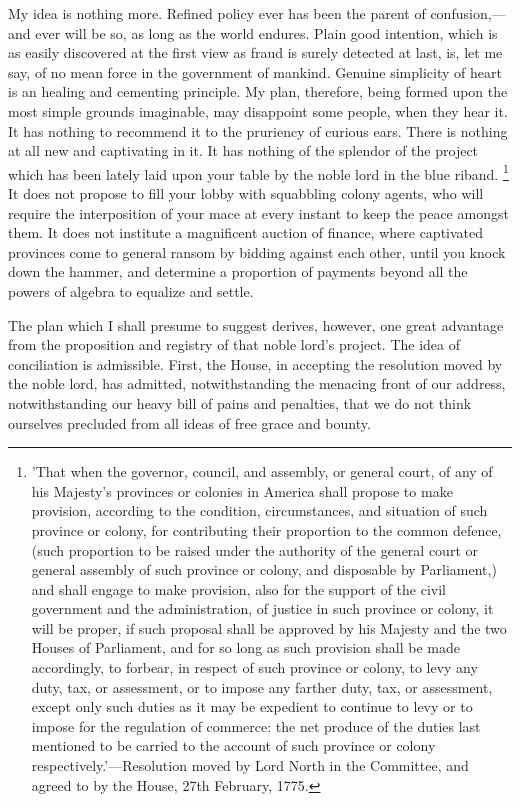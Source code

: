 My idea is nothing more. Refined policy ever has been the parent of confusion,—and ever will be so, as long as the world endures. Plain good intention, which is as easily discovered at the first view as fraud is surely detected at last, is, let me say, of no mean force in the government of mankind. Genuine simplicity of heart is an healing and cementing principle. My plan, therefore, being formed upon the most simple grounds imaginable, may disappoint some people, when they hear it. It has nothing to recommend it to the pruriency of curious ears. There is nothing at all new and captivating in it. It has nothing of the splendor of the project which has been lately laid upon your table by the noble lord in the blue riband.
\footnote{'That when the governor, council, and assembly, or general court, of any of his Majesty's provinces or colonies in America shall propose to make provision, according to the condition, circumstances, and situation of such province or colony, for contributing their proportion to the common defence, (such proportion to be raised under the authority of the general court or general assembly of such province or colony, and disposable by Parliament,) and shall engage to make provision, also for the support of the civil government and the administration, of justice in such province or colony, it will be proper, if such proposal shall be approved by his Majesty and the two Houses of Parliament, and for so long as such provision shall be made accordingly, to forbear, in respect of such province or colony, to levy any duty, tax, or assessment, or to impose any farther duty, tax, or assessment, except only such duties as it may be expedient to continue to levy or to impose for the regulation of commerce: the net produce of the duties last mentioned to be carried to the account of such province or colony respectively.'—Resolution moved by Lord North in the Committee, and agreed to by the House, 27th February, 1775.}
It does not propose to fill your lobby with squabbling colony agents, who will require the interposition of your mace at every instant to keep the peace amongst them. It does not institute a magnificent auction of finance, where captivated provinces come to general ransom by bidding against each other, until you knock down the hammer, and determine a proportion of payments beyond all the powers of algebra to equalize and settle.

The plan which I shall presume to suggest derives, however, one great advantage from the proposition and registry of that noble lord's project. The idea of conciliation is admissible. First, the House, in accepting the resolution moved by the noble lord, has admitted, notwithstanding the menacing front of our address, notwithstanding our heavy bill of pains and penalties, that we do not think ourselves precluded from all ideas of free grace and bounty.


